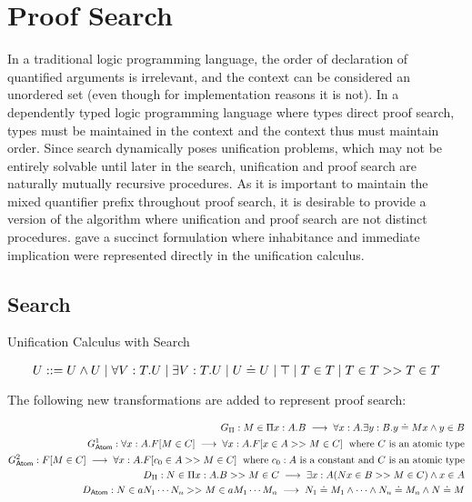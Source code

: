 \section{Proof Search}

In a traditional logic programming language, the order of declaration of quantified arguments is irrelevant, 
and the context can be considered an unordered set (even though for implementation reasons it is not). 
In a dependently typed logic programming language where types direct proof search, types must be maintained in the context
and the context thus must maintain order.   Since search dynamically poses unification problems, which may not be 
entirely solvable until later in the search, unification and proof search are naturally mutually recursive procedures.
As it is important to maintain the mixed quantifier prefix throughout proof search, it is desirable to provide a version 
of the algorithm where unification and proof search are not distinct procedures. 
\citep{pfenning1991logic} gave a succinct formulation where inhabitance and immediate implication were represented
directly in the unification calculus.  

\subsection{Search}

\begin{definition}
Unification Calculus with Search

\[
U ::= U \wedge U 
 \; | \; \forall V : T . U
 \; | \; \exists V : T . U 
 \; | \; U \doteq U
 \; | \; \top
  \; | \; T \in T 
  \; | \; T \in T >> T \in T
\]

\end{definition}

The following new transformations are added to represent proof search:

\begin{align}
G_\Pi : M \in \Pi x : A . B   \;\longrightarrow\; \forall x : A . \exists y : B . y \doteq M x \wedge y \in B
\\
G^1_{\mathsf{Atom}} : \forall x : A . F[M\in C]  \;\longrightarrow\; \forall x : A . F[x \in A >> M \in C]
\;\text{ where $C$ is an atomic type}
\\
G^2_{\mathsf{Atom}} : F[M\in C]  \;\longrightarrow\; \forall x : A . F[c_0 \in A >> M \in C]
\;\text{ where $c_0 : A$ is a constant and $C$ is an atomic type}
\\
D_\Pi : N\in \Pi x : A . B >> M \in C \;\longrightarrow\; \exists x : A ( N x \in B >> M \in C) \wedge x \in A
\\
D_{\mathsf{Atom}} : N\in a N_1 \cdots N_n >> M \in a M_1 \cdots M_n \;\longrightarrow\; N_1 \doteq M_1 \wedge \cdots \wedge N_n \doteq M_n \wedge N \doteq M
\end{align}

